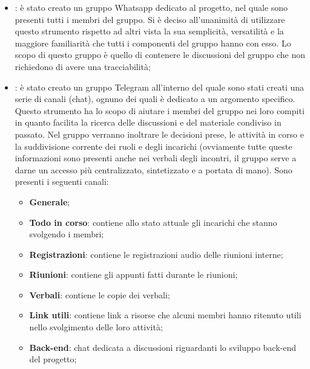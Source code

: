 \documentclass[a4paper,12pt]{article}
\begin{document}
                \begin{itemize}
                    \item \textbf{\underline{}}: è stato creato un gruppo Whatsapp dedicato al progetto, nel quale sono presenti tutti i membri del gruppo.
                        Si è deciso all'unanimità di utilizzare questo strumento rispetto ad altri vista la sua semplicità, versatilità e la maggiore familiarità che tutti i componenti del gruppo hanno con esso.
                        Lo scopo di questo gruppo è quello di contenere le discussioni del gruppo che non richiedono di avere una tracciabilità;
                    \item \textbf{\underline{}}: è stato creato un gruppo Telegram all'interno del quale sono stati creati una serie di canali (chat), ognuno dei quali è dedicato a un argomento specifico.
                        Questo strumento ha lo scopo di aiutare i membri del gruppo nei loro compiti in quanto facilita la ricerca delle discussioni e del materiale condiviso in passato.
                        Nel gruppo verranno inoltrare le decisioni prese, le attività in corso e la suddivisione corrente dei ruoli e degli incarichi (ovviamente tutte queste informazioni sono presenti anche nei verbali degli incontri, il gruppo serve a darne un accesso più centralizzato, sintetizzato e a portata di mano).
                    Sono presenti i seguenti canali:
                    \begin{itemize} \label{sec:canaliTelegram}
                        \item \textbf{Generale};
                        \item \textbf{Todo in corso}: contiene allo stato attuale gli incarichi che stanno svolgendo i membri;
                        \item \textbf{Registrazioni}: contiene le registrazioni audio delle riunioni interne;
                        \item \textbf{Riunioni}: contiene gli appunti fatti durante le riunioni;
                        \item \textbf{Verbali}: contiene le copie dei verbali;
                        \item \textbf{Link utili}: contiene link a risorse che alcuni membri hanno ritenuto utili nello svolgimento delle loro attività;
                        \item \textbf{Back-end}: chat dedicata a discussioni riguardanti lo sviluppo back-end del progetto;

\end{itemize}
\end{itemize}
\end{document}
